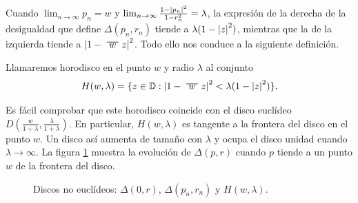 Cuando $\lim_{n \to \infty} p_n = w$ y $\lim_{n \to \infty} \frac{1-\left\lvert p_n\right\rvert^2}{1-r_n^2} = \lambda$, la expresión de la derecha de la desigualdad que define $\Delta(p_n, r_n)$ tiende a $\lambda(1 - \left\lvert z\right\rvert^2)$, mientras que la de la izquierda tiende a $\abs{1 - \xbar{w}z}^2$. Todo ello nos conduce a la siguiente definición. \\

\begin{definition}
    Llamaremos horodisco en el punto $w$ y radio $\lambda$ al conjunto
    \begin{equation*}
        H(w,\lambda) = \{z \in \disk : \abs{1 - \xbar{w} z}^2 < \lambda(1 - \abs{z}^2)\}.
    \end{equation*}
\end{definition}

Es fácil comprobar que este horodisco coincide con el disco euclídeo $D(\frac{w}{1+\lambda}, \frac{\lambda}{1+\lambda})$. En particular, $H(w, \lambda)$ es tangente a la frontera del disco en el punto $w$. Un disco así aumenta de tamaño con $\lambda$ y ocupa el disco unidad cuando $\lambda \to \infty$. La figura \ref{fig:noeuclideos} muestra la evolución de $\Delta(p,r)$ cuando $p$ tiende a un punto $w$ de la frontera del disco. \\

\begin{figure}[!htbp]
    \begin{minipage}[h]{0.35\textwidth}
        \centering
        \label{fig:noeuclideo1}
    \end{minipage} \hfill
    \begin{minipage}[h]{0.3\textwidth}
        \label{fig:noeuclideo2}
    \end{minipage} \hfill
    \begin{minipage}[h]{0.3\textwidth}
        \label{fig:noeuclideo3}
    \end{minipage}
    \caption{Discos no euclídeos: $\Delta(0, r)$, $\Delta(p_n, r_n)$ y $H(w, \lambda)$.}
    \label{fig:noeuclideos}
\end{figure}

